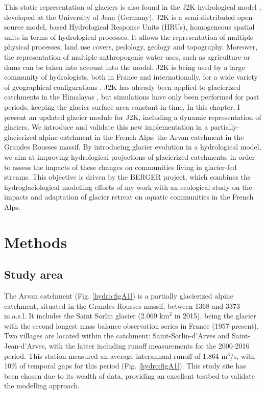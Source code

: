 This static representation of glaciers is also found in the J2K hydrological model \citep{krause_quantifying_2002}, developed at the University of Jena (Germany). J2K is a semi-distributed open-source model, based Hydrological Response Units (HRUs), homogeneous spatial units in terms of hydrological processes. It allows the representation of multiple physical processes, land use covers, pedology, geology and topography. Moreover, the representation of multiple anthropogenic water uses, such as agriculture or dams can be taken into account into the model.  J2K is being used by a large community of hydrologists, both in France and internationally, for a wide variety of geographical configurations \citep{krause_quantifying_2002, nepal_understanding_2014, braud_j2000-rhone_2017}. J2K has already been applied to glacierized catchments in the Himalayas \citep{nepal_understanding_2014}, but simulations have only been performed for past periods, keeping the glacier surface area constant in time. In this chapter, I present an updated glacier module for J2K, including a dynamic representation of glaciers. We introduce and validate this new implementation in a partially-glacierized alpine catchment in the French Alps: the Arvan catchment in the Grandes Rousses massif. By introducing glacier evolution in a hydrological model, we aim at improving hydrological projections of glacierized catchments, in order to assess the impacts of these changes on communities living in glacier-fed streams. This objective is driven by the BERGER project, which combines the hydroglaciological modelling efforts of my work with an ecological study on the impacts and adaptation of glacier retreat on aquatic communities in the French Alps.

\section{Methods}

\subsection{Study area}

The Arvan catchment (Fig. \ref{hydro:figA1}) is a partially glacierized alpine catchment, situated in the Grandes Rousses massif, between 1368 and 3373 m.a.s.l. It includes the Saint Sorlin glacier (2.069 km$^{2}$ in 2015), being the glacier with the second longest mass balance observation series in France (1957-present). Two villages are located within the catchment: Saint-Sorlin-d'Arves and Saint-Jean-d'Arves, with the latter including runoff measurements for the 2000-2016 period. This station measured an average interannual runoff of 1.864 m$^{3}$/s, with 10\% of temporal gaps for this period (Fig. \ref{hydro:figA1}). This study site has been chosen due to its wealth of data, providing an excellent testbed to validate the modelling approach.



